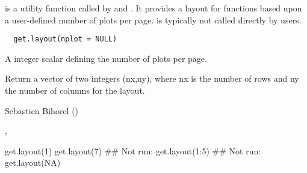 %
\begin{Description}\relax
{} is a utility function called by  and 
. It provides a layout for  functions based
upon a user-defined number of plots per page.  is typically 
not called directly by users.
\end{Description}
%
\begin{Usage}
\begin{verbatim}
  get.layout(nplot = NULL)
\end{verbatim}
\end{Usage}
%
\begin{Arguments}
\begin{ldescription}
\item[\code{nplot}] A integer scalar defining the number of plots per page.
\end{ldescription}
\end{Arguments}
%
\begin{Value}
Return a vector of two integers (nx,ny), where nx is the number of rows and
ny the number of columns for the  layout.
\end{Value}
%
\begin{Author}\relax
Sebastien Bihorel ()
\end{Author}
%
\begin{SeeAlso}\relax
{},
\end{SeeAlso}
%
\begin{Examples}
\begin{ExampleCode}
  get.layout(1)
  get.layout(7)
  ## Not run: get.layout(1:5)
  ## Not run: get.layout(NA)
\end{ExampleCode}
\end{Examples}
